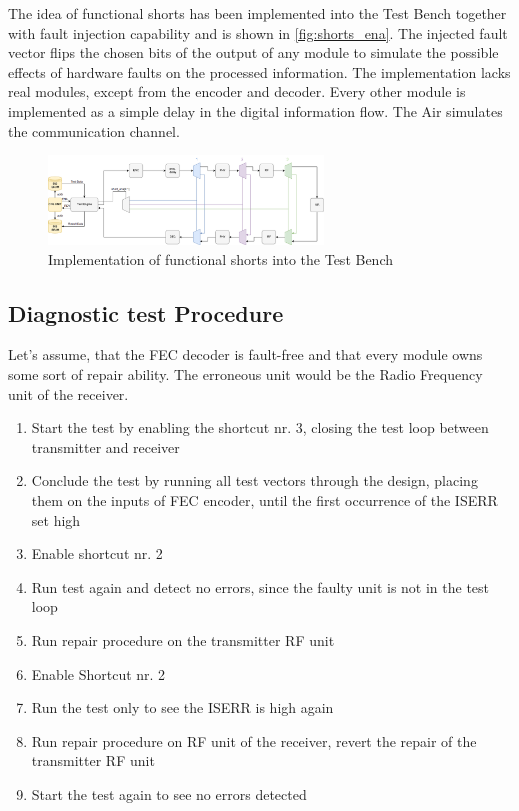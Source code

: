 The idea of functional shorts has been implemented into the Test Bench together with fault injection capability and is shown in \autoref{fig:shorts_ena}. The injected fault vector flips the chosen bits of the output of any module to simulate the possible effects of hardware faults on the processed information. The implementation lacks real modules, except from the encoder and decoder. Every other module is implemented as a simple delay in the digital information flow. The Air simulates the communication channel. 

\begin{figure}[h]
\centering
\includegraphics[width=0.65\textwidth]{figures/Short_ena.png}
\caption{Implementation of functional shorts into the Test Bench}
\label{fig:short_ena}
\end{figure}

\subsection{Diagnostic test Procedure}
Let's assume, that the FEC decoder is fault-free and that every module owns some sort of repair ability. The erroneous unit would be the Radio Frequency unit of the receiver.
\begin{enumerate}
    \item Start the test by enabling the shortcut nr. 3, closing the test loop between transmitter and receiver
    \item Conclude the test by running all test vectors through the design, placing them on the inputs of FEC encoder, until the first occurrence of the ISERR set high
    \item Enable shortcut nr. 2
    \item Run test again and detect no errors, since the faulty unit is not in the test loop
    \item Run repair procedure on the transmitter RF unit
    \item Enable Shortcut nr. 2
    \item Run the test only to see the ISERR is high again
    \item Run repair procedure on RF unit of the receiver, revert the repair of the transmitter RF unit
    \item Start the test again to see no errors detected
\end{enumerate}


